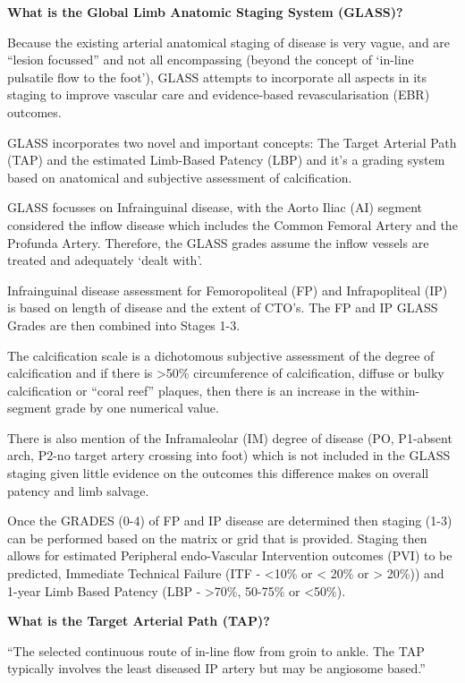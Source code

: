 \documentclass[
]{book}
\begin{document}
\textbf{What is the Global Limb Anatomic Staging System (GLASS)?}
\citep{conteGlobalVascularGuidelines2019a}

Because the existing arterial anatomical staging of disease is very
vague, and are ``lesion focussed'' and not all encompassing (beyond the
concept of `in-line pulsatile flow to the foot'), GLASS attempts to
incorporate all aspects in its staging to improve vascular care and
evidence-based revascularisation (EBR) outcomes.~

GLASS incorporates two novel and important concepts: The Target Arterial
Path (TAP) and the estimated Limb-Based Patency (LBP) and it's a grading
system based on anatomical and subjective assessment of calcification.

GLASS focusses on Infrainguinal disease, with the Aorto Iliac (AI)
segment considered the inflow disease which includes the Common Femoral
Artery and the Profunda Artery. Therefore, the GLASS grades assume the
inflow vessels are treated and adequately `dealt with'.~

Infrainguinal disease assessment for Femoropoliteal (FP) and
Infrapopliteal (IP) is based on length of disease and the extent of
CTO's. The FP and IP GLASS Grades are then combined into Stages 1-3.~

The calcification scale is a dichotomous subjective assessment of the
degree of calcification and if there is \textgreater50\% circumference of
calcification, diffuse or bulky calcification or ``coral reef'' plaques,
then there is an increase in the within-segment grade by one numerical
value.

There is also mention of the Inframaleolar (IM) degree of disease (PO,
P1-absent arch, P2-no target artery crossing into foot) which is not
included in the GLASS staging given little evidence on the outcomes this
difference makes on overall patency and limb salvage.

Once the GRADES (0-4) of FP and IP disease are determined then staging
(1-3) can be performed based on the matrix or grid that is provided.
Staging then allows for estimated Peripheral endo-Vascular Intervention
outcomes (PVI) to be predicted, Immediate Technical Failure (ITF - \textless10\%
or \textless{} 20\% or \textgreater{} 20\%)) and 1-year Limb Based Patency (LBP - \textgreater70\%, 50-75\%
or \textless50\%).~

\textbf{What is the Target Arterial Path (TAP)?}

``The selected continuous route of in-line flow from groin to ankle. The
TAP typically involves the least diseased IP artery but may be angiosome
based.''
\end{document}
